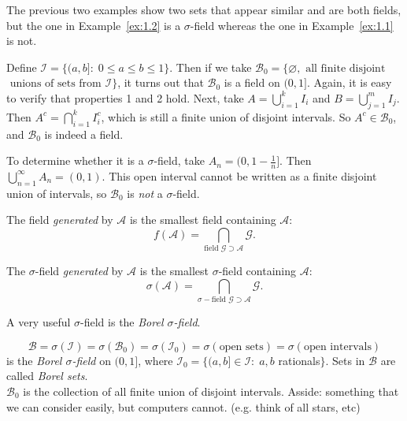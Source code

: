 \documentclass[11pt,fleqn]{book} %
\begin{document}
The previous two examples show two sets that appear similar and are both fields, but the one in Example~\ref{ex:1.2} is a $\sigma$-field whereas the one in Example~\ref{ex:1.1} is not.

\begin{example} \label{ex:1.3}
	Define $\mathcal{I} = \{(a,b]:\;0 \leq a \leq b \leq 1\}$. Then if we take $\mathcal{B}_0 = \{\varnothing, \textrm{ all finite disjoint}$ $\textrm{ unions of sets from } \mathcal{I}\}$, it turns out that $\mathcal{B}_0$ is a field on $(0,1]$. Again, it is easy to verify that properties 1 and 2 hold. Next, take $A = \bigcup_{i=1}^k I_i$ and $B = \bigcup_{j=1}^m I_j$. Then $A^c = \bigcap_{i=1}^k I_i^c$, which is still a finite union of disjoint intervals. So $A^c \in \mathcal{B}_0$, and $\mathcal{B}_0$ is indeed a field.

	To determine whether it is a $\sigma$-field, take $A_n = (0,1-\frac{1}{n}]$. Then $\bigcup_{n=1}^\infty A_n = (0,1)$. This open interval cannot be written as a finite disjoint union of intervals, so $\mathcal{B}_0$ is \emph{not} a $\sigma$-field.
\end{example}



\begin{definition} \label{def:1.3}
	The field \emph{generated} by $\mathcal{A}$ is the smallest field containing $\mathcal{A}$:
	\[
		f(\mathcal{A}) = \bigcap_{\textrm{field } \mathcal{G} \supset \mathcal{A}} \mathcal{G}.
	\]

	The $\sigma$-field \emph{generated} by $\mathcal{A}$ is the smallest $\sigma$-field containing $\mathcal{A}$:
	\[
		\sigma(\mathcal{A}) = \bigcap_{\sigma-\textrm{field } \mathcal{G} \supset \mathcal{A}} \mathcal{G}.
	\]
\end{definition}

A very useful $\sigma$-field is the \emph{Borel $\sigma$-field}.

\begin{definition} \label{def:1.4}
			$$\mathcal{B} = \sigma(\mathcal{I}) = \sigma(\mathcal{B}_0) = \sigma(\mathcal{I}_0) = \sigma(\textrm{open sets}) = \sigma(\textrm{open intervals})$$
	 is the \emph{Borel $\sigma$-field} on $(0,1]$, where $\mathcal{I}_0 = \{(a,b] \in \mathcal{I}:\;a,b$ rationals$\}$. Sets in $\mathcal{B}$ are called \emph{Borel sets}.\\

	 $\mathcal{B}_0$ is the collection of all finite union of disjoint intervals. Asside: something that we can consider easily, but computers cannot. (e.g. think of all stars, etc)

\end{definition}
\end{document}
